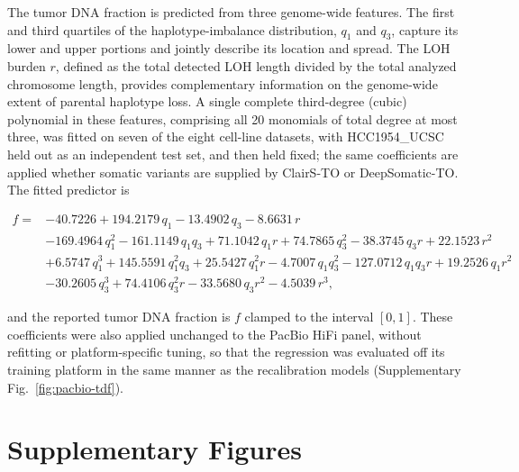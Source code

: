 \documentclass[pdflatex,sn-nature]{sn-jnl}
\def\pandocbounded#1{%
  \begingroup
  \setkeys{Gin}{width=1.0\linewidth,height=1.0\textheight,keepaspectratio}%
  #1%
  \endgroup
}
\begin{document}
The tumor DNA fraction is predicted from three genome-wide features. The first and third quartiles of the haplotype-imbalance distribution, \(q_1\) and \(q_3\), capture its lower and upper portions and jointly describe its location and spread. The LOH burden \(r\), defined as the total detected LOH length divided by the total analyzed chromosome length, provides complementary information on the genome-wide extent of parental haplotype loss. A single complete third-degree (cubic) polynomial in these features, comprising all 20 monomials of total degree at most three, was fitted on seven of the eight cell-line datasets, with HCC1954\_UCSC held out as an independent test set, and then held fixed; the same coefficients are applied whether somatic variants are supplied by ClairS-TO or DeepSomatic-TO. The fitted predictor is

\[
\begin{aligned}
f ={}& -40.7226 + 194.2179\,q_1 - 13.4902\,q_3 - 8.6631\,r \\
&- 169.4964\,q_1^2 - 161.1149\,q_1 q_3 + 71.1042\,q_1 r + 74.7865\,q_3^2 - 38.3745\,q_3 r + 22.1523\,r^2 \\
&+ 6.5747\,q_1^3 + 145.5591\,q_1^2 q_3 + 25.5427\,q_1^2 r - 4.7007\,q_1 q_3^2 - 127.0712\,q_1 q_3 r + 19.2526\,q_1 r^2 \\
&- 30.2605\,q_3^3 + 74.4106\,q_3^2 r - 33.5680\,q_3 r^2 - 4.5039\,r^3,
\end{aligned}
\]

and the reported tumor DNA fraction is \(f\) clamped to the interval \([0,1]\). These coefficients were also applied unchanged to the PacBio HiFi panel, without refitting or platform-specific tuning, so that the regression was evaluated off its training platform in the same manner as the recalibration models (Supplementary Fig.~\ref{fig:pacbio-tdf}).

\clearpage
\section{Supplementary Figures}
\FloatBarrier

\end{document}
